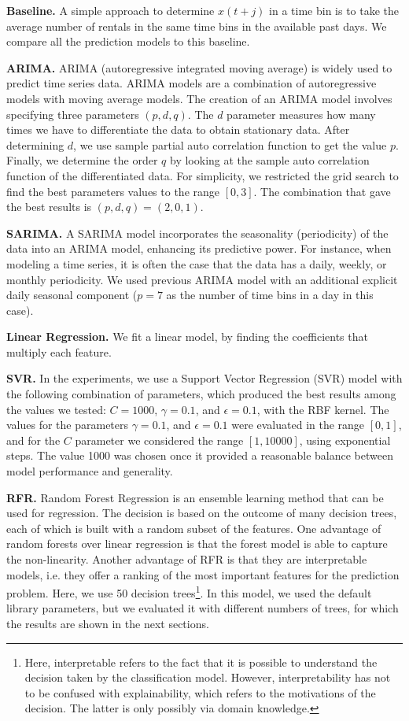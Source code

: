 \textbf{Baseline.} A simple approach to determine $x(t+j)$ in a time bin is to take the average number of rentals in the same time bins in the available past days. 
We compare all the prediction models to this baseline. 

\textbf{ARIMA.} ARIMA (autoregressive integrated moving average) is widely used to predict time series data.  ARIMA models are a combination of autoregressive models with moving average models. The creation of an ARIMA model involves specifying three parameters $(p, d, q)$. The $d$ parameter measures how many times we have to differentiate the data to obtain stationary data. After determining $d$, we use sample partial auto correlation function to get the value $p$. Finally, we determine the order $q$ by looking at the sample auto correlation function of the differentiated data. 
For simplicity, we restricted the grid search to find the best parameters values to the range $[0, 3]$. The combination that gave the best results is $(p, d, q) = (2, 0, 1)$.


\textbf{SARIMA.} A SARIMA model incorporates the seasonality (periodicity) of the data into an ARIMA model, enhancing its predictive power. For instance, when modeling a time series, it is often the case that the data has a daily, weekly, or monthly periodicity. We used previous ARIMA model with an additional explicit daily seasonal component ($p=7$ as the number of time bins in a day in this case). 

\textbf{Linear Regression.} We fit a linear model, by finding the coefficients that multiply each feature. 

\textbf{SVR.}  In the experiments, we use a Support Vector Regression (SVR) model with the following combination of parameters, which produced the best results among the values we tested: $C = 1000$, $\gamma = 0.1$, and $\epsilon = 0.1$, with the RBF kernel. 
The values for the parameters $\gamma = 0.1$, and $\epsilon = 0.1$ were evaluated in the range $[0, 1]$, and for the $C$ parameter we considered the range $[1, 10000]$, using exponential steps. The value 1000 was chosen once it provided a reasonable balance between model performance and generality.

\textbf{RFR.} Random Forest Regression is an ensemble learning method that can be used  for regression. The decision is based on the outcome of many decision trees, each of which is built with a random subset of the features. One advantage of random forests over linear regression is that the forest model is able to capture the non-linearity. Another advantage of RFR is that they are interpretable models, i.e. they offer a ranking of the most important features for the prediction problem. Here, we use 50 decision trees\footnote{Here, interpretable refers to the fact that it is possible to understand the decision taken by the classification model. However, interpretability has not to be confused with explainability, which refers to the motivations of the decision. The latter is only possibly via domain knowledge.}. 
In this model, we used the default library parameters, but we evaluated it with different numbers of trees, for which the results are shown in the next sections.

